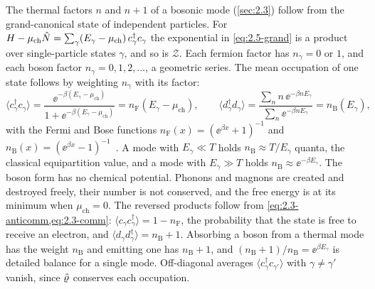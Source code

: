 The thermal factors $n$ and $n + 1$ of a bosonic mode (\cref{sec:2.3}) follow from the grand-canonical state of independent particles. For $H - \mu_{\mathrm{ch}}\hat{N} = \sum_\gamma(E_\gamma - \mu_{\mathrm{ch}})\,c^\dagger_\gamma c_\gamma$ the exponential in \cref{eq:2.5-grand} is a product over single-particle states $\gamma$, and so is $\mathcal{Z}$. Each fermion factor has $n_\gamma = 0$ or $1$, and each boson factor $n_\gamma = 0, 1, 2, \dots$, a geometric series. The mean occupation of one state follows by weighting $n_\gamma$ with its factor:
\begin{equation}
  \langle c^\dagger_\gamma c_\gamma\rangle = \frac{\ee^{-\beta(E_\gamma - \mu_{\mathrm{ch}})}}{1 + \ee^{-\beta(E_\gamma - \mu_{\mathrm{ch}})}} = n_{\mathrm{F}}(E_\gamma - \mu_{\mathrm{ch}}), \qquad
  \langle d^\dagger_\gamma d_\gamma\rangle = \frac{\sum_n n\,\ee^{-\beta nE_\gamma}}{\sum_n\ee^{-\beta nE_\gamma}} = n_{\mathrm{B}}(E_\gamma) ,
  \label{eq:2.5-nF}
\end{equation}
with the Fermi and Bose functions $n_{\mathrm{F}}(x) = (\ee^{\beta x} + 1)^{-1}$ and $n_{\mathrm{B}}(x) = (\ee^{\beta x} - 1)^{-1}$~\cite{landau1980statistical}. A mode with $E_\gamma \ll T$ holds $n_{\mathrm{B}} \approx T/E_\gamma$ quanta, the classical equipartition value, and a mode with $E_\gamma \gg T$ holds $n_{\mathrm{B}} \approx \ee^{-\beta E_\gamma}$. The boson form has no chemical potential. Phonons and magnons are created and destroyed freely, their number is not conserved, and the free energy is at its minimum when $\mu_{\mathrm{ch}} = 0$. The reversed products follow from \cref{eq:2.3-anticomm,eq:2.3-comm}: $\langle c_\gamma c^\dagger_\gamma\rangle = 1 - n_{\mathrm{F}}$, the probability that the state is free to receive an electron, and $\langle d_\gamma d^\dagger_\gamma\rangle = n_{\mathrm{B}} + 1$. Absorbing a boson from a thermal mode has the weight $n_{\mathrm{B}}$ and emitting one has $n_{\mathrm{B}} + 1$, and $(n_{\mathrm{B}} + 1)/n_{\mathrm{B}} = \ee^{\beta E_\gamma}$ is detailed balance for a single mode. Off-diagonal averages $\langle c^\dagger_\gamma c_{\gamma'}\rangle$ with $\gamma \ne \gamma'$ vanish, since $\hat{\varrho}$ conserves each occupation.

